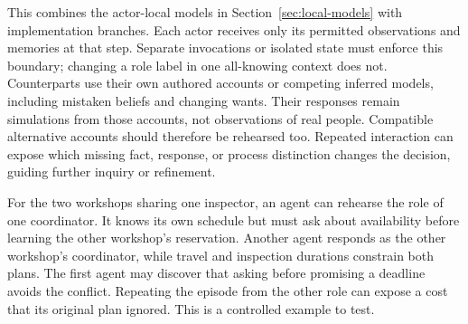 \documentclass[10pt]{article}
\begin{document}
This combines the actor-local models in Section~\ref{sec:local-models} with
implementation branches. Each actor receives only its permitted observations
and memories at that step. Separate invocations or isolated state must enforce
this boundary; changing a role label in one all-knowing context does not.
Counterparts use their own authored accounts or competing inferred models,
including mistaken beliefs and changing wants. Their responses remain
simulations from those accounts, not observations of real people. Compatible
alternative accounts should therefore be rehearsed too. Repeated interaction
can expose which missing fact, response, or process distinction changes the
decision, guiding further inquiry or refinement.

For the two workshops sharing one inspector, an agent can rehearse the role
of one coordinator. It knows its own schedule but must ask about availability
before learning the other workshop's reservation. Another agent responds as
the other workshop's coordinator, while travel and inspection durations
constrain both plans.
The first agent may discover that asking before promising a deadline avoids
the conflict. Repeating the episode from the other role can expose a cost that
its original plan ignored. This is a controlled example to test.
\end{document}
